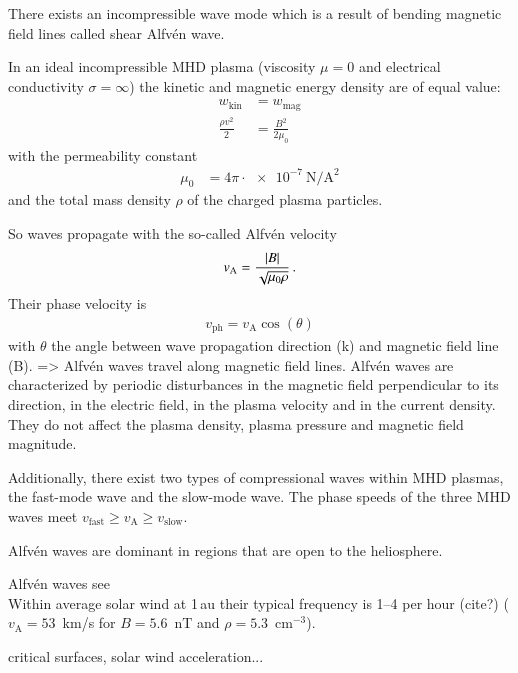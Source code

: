 There exists an incompressible wave mode which is a result of bending magnetic field lines called shear Alfvén wave.

In an ideal incompressible MHD plasma (viscosity $\mu = 0$ and electrical conductivity $\sigma = \infty$) the kinetic and magnetic energy density are of equal value: 
\begin{align}
	w_\text{kin} &= w_\text{mag}\\
	\frac{\rho v^2}{2} &= \frac{B^2}{2 \mu_0}	\nonumber
\end{align}
with the permeability constant
\begin{align}
	\mu_0 &= 4 \pi \cdot \SI{e-7}{\newton\per\ampere\squared}	\nonumber
\end{align}
and the total mass density $\rho$ of the charged plasma particles.

So waves propagate with the so-called Alfvén velocity
\begin{align}
	v_\text{A} = \frac{|B|}{\sqrt{\mu_0 \rho}}	\text{\,.}
\end{align}
Their phase velocity is
\begin{align}
	v_\text{ph} = v_\text{A} \cos(\theta)
\end{align}
with $\theta$ the angle between wave propagation direction (k) and magnetic field line (B). => Alfvén waves travel along magnetic field lines. Alfvén waves are characterized by periodic disturbances in the magnetic field perpendicular to its direction, in the electric field, in the plasma velocity and in the current density. They do not affect the plasma density, plasma pressure and magnetic field magnitude.

Additionally, there exist two types of compressional waves within MHD plasmas, the fast-mode wave and the slow-mode wave. The phase speeds of the three MHD waves meet $v_\text{fast} \geq v_\text{A} \geq v_\text{slow}$. %

Alfvén waves are dominant in regions that are open to the heliosphere. %

Alfvén waves see \citep[pp.~51ff.]{Kivelson1995}\\


Within average solar wind at 1\,au their typical frequency is 1--4 per hour (cite?) ($v_\text{A} = 53$~km/s for $B = 5.6$~nT and $\rho = 5.3$~cm$^{-3}$).

critical surfaces, solar wind acceleration...\\

